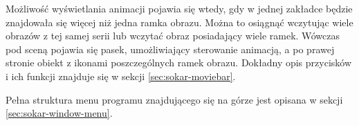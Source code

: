 \par
Możliwość wyświetlania animacji pojawia się wtedy, gdy w jednej zakładce będzie znajdowała się więcej niż jedna ramka obrazu.
Można to osiągnąć wczytując wiele obrazów z tej samej serii lub wczytać obraz posiadający wiele ramek.
Wówczas pod sceną pojawia się pasek, umożliwiający sterowanie animacją, a po prawej stronie obiekt z ikonami poszczególnych ramek obrazu.
Dokładny opis przycisków i ich funkcji znajduje się w sekcji \ref{sec:sokar-moviebar}.
\par
Pełna struktura menu programu znajdującego się na górze jest opisana w sekcji \ref{sec:sokar-window-menu}.